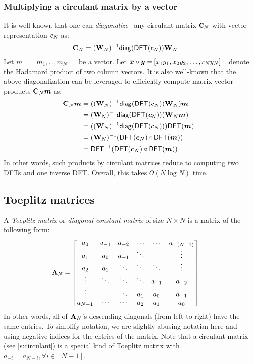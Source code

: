 \subsubsection{Multiplying a circulant matrix by a vector}
\label{s:circulant:diag-dft}
\label{s:circulant:multiply-vec}
It is well-known that one can \textit{diagonalize}~\cite{Diag20} any circulant matrix $\mathbf{C}_N$ with vector representation $\bm{c}_N$ as:
\begin{align}
    \mathbf{C}_N
     &= (\mathbf{W}_N)^{-1} \mathsf{diag}(\mathsf{DFT}(\bm{c}_N)) \mathbf{W}_N
\end{align}
Let $m=[m_1,\dots,m_N]^\top$ be a vector.
Let $\bm{x}\circ\bm{y} = [x_1 y_1, x_2 y_2,\dots, x_N y_N]^\top$ denote the Hadamard product of two column vectors.
It is also well-known that the above diagonalization can be leveraged to efficiently compute matrix-vector products $\mathbf{C}_N\bm{m}$ as:
\begin{align}
    \mathbf{C}_N \bm{m}
        &= ((\mathbf{W}_N)^{-1} \mathsf{diag}(\mathsf{DFT}(\bm{c}_N)) \mathbf{W}_N)\bm{m}\\
        &= (\mathbf{W}_N)^{-1} \mathsf{diag}(\mathsf{DFT}(\bm{c}_N)) (\mathbf{W}_N\bm{m})\\
        &= ((\mathbf{W}_N)^{-1} \mathsf{diag}(\mathsf{DFT}(\bm{c}_N))) \mathsf{DFT}(\bm{m})\\
        &= (\mathbf{W}_N)^{-1} (\mathsf{DFT}(\bm{c}_N)\circ \mathsf{DFT}(\bm{m}))\\
        &= \mathsf{DFT}^{-1}(\mathsf{DFT}(\bm{c}_N)\circ \mathsf{DFT}(\bm{m}))
\end{align}
In other words, such products by circulant matrices reduce to computing two DFTs and one inverse DFT.
Overall, this takes $O(N\log{N})$ time.

\subsection{Toeplitz matrices}
\label{s:toeplitz}

A \textit{Toeplitz matrix} or \textit{diagonal-constant matrix} of size $N\times N$ is a matrix of the following form:
\begin{align}
\mathbf{A}_N&=\begin{bmatrix}
    a_{0}   & a_{-1} & a_{-2} & \cdots & \cdots & a_{-(N-1)}\\
    a_{1}   & a_{0}  & a_{-1} & \ddots &        & \vdots\\
    a_{2}   & a_{1}  & \ddots & \ddots & \ddots & \vdots\\
    \vdots  & \ddots & \ddots & \ddots & a_{-1} & a_{-2}\\
    \vdots  &        & \ddots & a_{1}  & a_{0}  & a_{-1}\\
    a_{N-1} & \cdots & \cdots & a_{2}  & a_{1}  & a_{0}
\end{bmatrix}
\end{align}
In other words, all of $\mathbf{A}_N$'s descending diagonals (from left to right) have the same entries.
To simplify notation, we are slightly abusing notation here and using negative indices for the entries of the matrix.
Note that a circulant matrix (see \cref{s:circulant}) is a special kind of Toeplitz matrix with $a_{-i} = a_{N-i},\forall i\in [N - 1]$.

